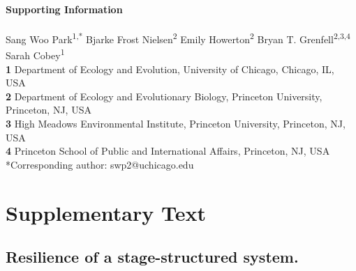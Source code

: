 \documentclass[12pt]{article}
\date{\today}
\begin{document}
\begin{flushleft}{
	\Large
	\textbf{Supporting Information}\\
	\textbf{}
}
\newline
\\
Sang Woo Park\textsuperscript{1,*}
Bjarke Frost Nielsen\textsuperscript{2}
Emily Howerton\textsuperscript{2}
Bryan T. Grenfell\textsuperscript{2,3,4}
Sarah Cobey\textsuperscript{1}
\bigskip
\\
\textbf{1} Department of Ecology and Evolution, University of Chicago, Chicago, IL, USA
\\
\textbf{2} Department of Ecology and Evolutionary Biology, Princeton University, Princeton, NJ, USA
\\
\textbf{3} High Meadows Environmental Institute, Princeton University, Princeton, NJ, USA
\\
\textbf{4} Princeton School of Public and International Affairs, Princeton, NJ, USA
\bigskip
*Corresponding author: swp2@uchicago.edu
\end{flushleft}

\pagebreak

\setcounter{figure}{0}
\setcounter{equation}{0}
\renewcommand{\thefigure}{S\arabic{figure}}
\renewcommand{\theequation}{S\arabic{equation}}

\section*{Supplementary Text}

\subsection*{Resilience of a stage-structured system.}
\end{document}
